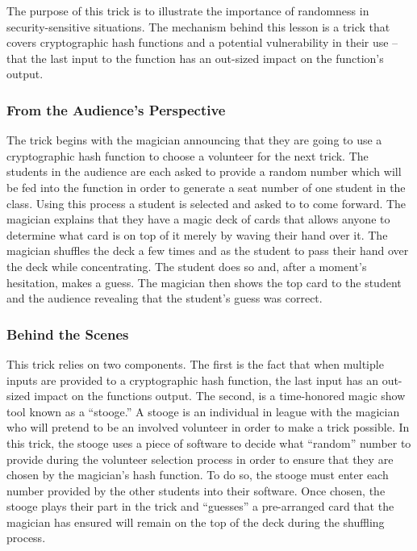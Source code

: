 The purpose of this trick is to illustrate the importance of randomness in
security-sensitive situations.
The mechanism behind this lesson is a trick
that covers cryptographic hash functions
and a potential vulnerability
in their use -- that the last input to the function has an out-sized impact on
the function's output.


\subsubsection{From the Audience's Perspective}

The trick begins with the magician announcing that they are going to use a
cryptographic hash function to choose a volunteer for the next trick.  The
students in the audience are each asked to provide a random number which will be
fed into the function in order to generate a seat number of one student in the
class.  Using this process a student is selected and asked to to come
forward.  The magician explains that they have a magic deck of cards that allows
anyone to determine what card is on top of it merely by waving their hand over
it.  The magician shuffles the deck a few times and as the student to pass their
hand over the deck while concentrating.  The student does so and, after a
moment's hesitation, makes a guess.  The magician then shows the top card to the
student and the audience revealing that the student's guess was correct.

\subsubsection{Behind the Scenes}

This trick relies on two components.  The first is the fact that when
multiple inputs are provided to a cryptographic hash function, the last input
has an out-sized impact on the functions output.  The second, is a time-honored
magic show tool known as a ``stooge.'' A stooge is an individual in league with
the magician who will pretend to be an involved volunteer in order to make a
trick possible.  In this trick, the stooge uses a piece of software to decide
what ``random'' number to provide during the volunteer selection process in
order to ensure that they are chosen by the magician's hash function.  To do so,
the stooge must enter each number provided by the other students into their
software.  Once chosen, the stooge plays their part in the trick and ``guesses''
a pre-arranged card that the magician has ensured will remain on the top of the
deck during the shuffling process.

